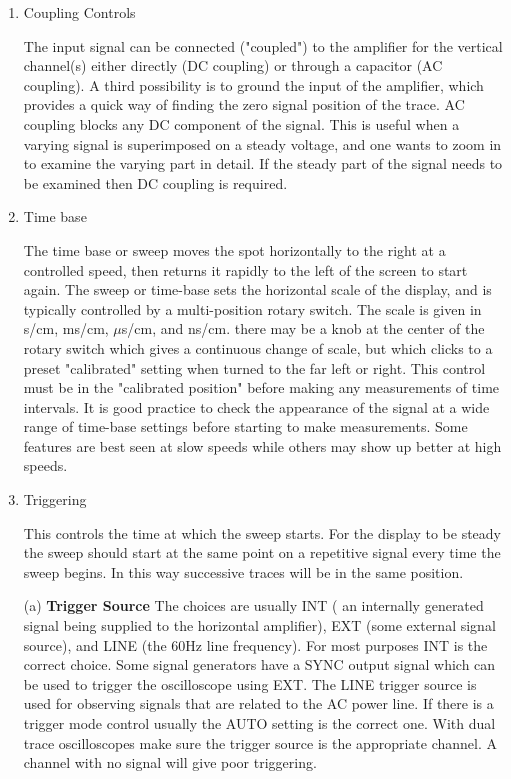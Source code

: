 \begin{enumerate}
\item Coupling Controls

The input signal can be connected ("coupled") to the amplifier for the vertical channel(s) either directly (DC coupling) or through a capacitor (AC coupling). A third possibility is to ground the input of the amplifier, which provides a quick way of finding the zero signal position of the trace. AC coupling blocks any DC component of the signal. This is useful when a varying signal is superimposed on a steady voltage, and one wants to zoom in to examine the varying part in detail. If the steady part of the signal needs to be examined then DC coupling is required.

\item Time base

The time base or sweep moves the spot horizontally to the right at a controlled speed, then returns it rapidly to the left of the screen to start again. The sweep or time-base sets the horizontal scale of the display, and is typically controlled by a multi-position rotary switch. The scale is given in s/cm, ms/cm, $\mu$s/cm, and ns/cm. there may be a knob at the center of the rotary switch which gives a continuous change of scale, but which clicks to a preset "calibrated" setting when turned to the far left or right. This control must be in the "calibrated position" before making any measurements of time intervals. It is good practice to check the appearance of the signal at a wide range of time-base settings before starting to make measurements. Some features are best seen at slow speeds while others may show up better at high speeds.

\item Triggering

This controls the time at which the sweep starts. For the display to be steady the sweep should start at the same point on a repetitive signal every time the sweep begins. In this way successive traces will be in the same position.

(a) {\bf Trigger Source} The choices are usually INT ( an internally generated signal being supplied to the horizontal amplifier), EXT (some external signal source), and LINE (the 60Hz line frequency). For most purposes INT is the correct choice. Some signal generators have a SYNC output signal which can be used to trigger the oscilloscope using EXT. The LINE trigger source is used for observing signals that are related to the AC power line. If there is a trigger mode control usually the AUTO setting is the correct one. With dual trace oscilloscopes make sure the trigger source is the appropriate channel. A channel with no signal will give poor triggering.


\end{enumerate}
